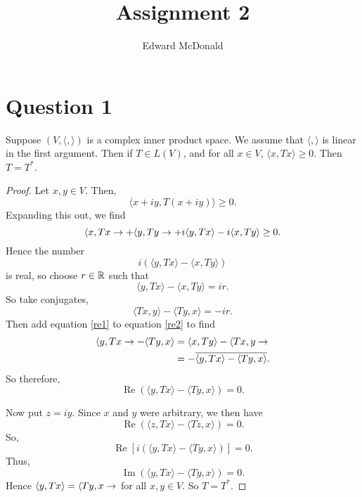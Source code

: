 \documentclass{unswmaths}
\begin{document}
\subject{Functional Analysis}
\author{Edward McDonald}
\title{Assignment 2}


\newcommand{\Real}{\operatorname{Re}}
\newcommand{\Img}{\operatorname{Im}}
\newcommand{\lan}{\langle}
\newcommand{\ran}{\rangle}

\unswtitle{}

\section*{Question 1}
\begin{theorem}
    Suppose $(V,\lan,\ran)$ is a complex inner product space. We assume that $\lan,\ran$
    is linear in the first argument. Then
    if $T \in L(V)$, and for all $x \in V$, $\lan x,Tx\ran \geq 0$. Then $T = T^*$.
\end{theorem}
\begin{proof}
    Let $x,y \in V$. Then,
    \begin{equation*}
        \lan x+iy,T(x+iy)\ran \geq 0.
    \end{equation*}
    Expanding this out, we find
    \begin{equation*}
        \lan x,Tx\ra + \lan y,Ty\ra + i\lan y,Tx\ran-i\lan x,Ty\ran \geq 0. 
    \end{equation*}
    Hence the number
    \begin{equation*}
        i(\lan y,Tx\ran-\lan x,Ty\ran)
    \end{equation*}
    is real, so choose $r \in \mathbb{R}$ such that
    \begin{equation}
    \label{re1}
        \lan y,Tx\ran -\lan x,Ty\ran = ir.
    \end{equation}
    So take conjugates,
    \begin{equation}
    \label{re2}
        \lan Tx,y\ran-\lan Ty,x\ran = -ir.
    \end{equation}
    Then add equation \ref{re1} to equation \ref{re2} to find
    \begin{align*}
        \lan y,Tx\ra - \lan Ty,x\ran &= \lan x,Ty\ran-\lan Tx,y\ra\\
        &= -\overline{\lan y,Tx\ran - \lan Ty,x\ran}.
    \end{align*}
    So therefore,
    \begin{equation*}
        \Real(\lan y,Tx\ran - \lan Ty,x\ran) = 0.
    \end{equation*}
    
    Now put $z = iy$. Since $x$ and $y$ were arbitrary, we then have
    \begin{equation*}
        \Real(\lan z,Tx\ran - \lan Tz,x\ran) = 0.
    \end{equation*}
    So,
    \begin{equation*}
        \Real[i(\lan y,Tx\ran-\lan Ty,x\ran)] = 0.
    \end{equation*}
    Thus,
    \begin{equation*}
        \Img(\lan y,Tx\ran-\lan Ty,x\ran) = 0.
    \end{equation*}
    Hence $\lan y,Tx\ran = \lan Ty,x\ra$ for all $x,y \in V$. So $T = T^*$.
\end{proof}
\end{document}

